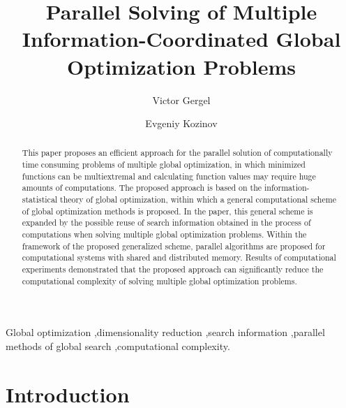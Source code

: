 \documentclass[review]{elsarticle}
\begin{document}
\begin{frontmatter}

\title{Parallel Solving of Multiple Information-Coordinated Global Optimization Problems}


\author[mymainaddress]{Victor Gergel}

\author[mymainaddress]{Evgeniy Kozinov}

\address[mymainaddress]{Institute of Informational Technologies, Mathematics and Mechanics, Mathematical Center, Lobachevsky State University of Nizhny Novgorod, Nizhni Novgorod, Russia}



\begin{abstract}
This paper proposes an efficient approach for the parallel solution of computationally time consuming problems of multiple global optimization, in which minimized functions can be multiextremal and calculating function values may require huge amounts of computations. The proposed approach is based on the information-statistical theory of global optimization, within which a general computational scheme of global optimization methods is proposed. In the paper, this general scheme is expanded by the possible reuse of search information obtained in the process of computations when solving multiple global optimization problems. Within the framework of the proposed generalized scheme, parallel algorithms are proposed for computational systems with shared and distributed memory. Results of computational experiments demonstrated that the proposed approach can significantly reduce the computational complexity of solving multiple global optimization problems.
\end{abstract}

\begin{keyword}
Global optimization \sep dimensionality reduction \sep search information \sep parallel methods of global search \sep computational complexity.
\end{keyword}

\end{frontmatter}

\linenumbers


\section{Introduction}\label{sec:1}
\end{document}
